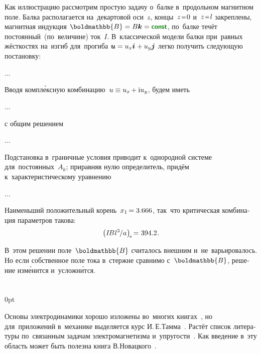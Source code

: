 \begin{otherlanguage}{russian}
Как иллюстрацию рассмотрим простую задачу о~балке в~продольном магнитном поле. Балка располагается на~декартовой оси~$z$, концы~${z \narroweq 0}$ и~${z \narroweq l}$ закреплены, магнитная индукция ${\boldmathbb{B} = B\bm{k} = \boldconst}$, по~балке течёт постоянный~(по~величине) ток~$I$. В~классической модели балки при~равных жёсткостях на~изгиб для~прогиба ${\bm{u} = u_x\bm{i} \hspace{.12ex} + u_y\bm{j}}$ легко получить следующую постановку:

...

Вводя компл\'{е}ксную комбинацию~${u \equiv u_x \hspace{-0.16ex} + \mathrm{i} u_y}$, будем иметь

...

\noindent с общим решением

...

\noindent Подстановка в~граничные условия приводит к~однородной системе для~постоянных~${A_k}$; приравняв нулю определитель, придём к~характеристическому уравнению

...


\noindent Наименьший положительный корень~${x_1 \hspace{-0.2ex} = 3.666}$, так~что критическая комбинация параметров такова:
\[
\left( I \hspace{-0.25ex} B \hspace{.1ex} {l^3} \hspace{-0.2ex} / a \hspace{.1ex} \right)_{\hspace{-0.32ex}*} \hspace{-0.32ex} = \hspace{.1ex} 394.2 \hspace{.12ex}.
\]

В~этом решении поле~$\boldmathbb{B}$ считалось внешним и~не~варьировалось. Но если собственное поле тока в~стержне сравнимо с~$\boldmathbb{B}$, решение изм\'{е}нится и~усложн\'{и}тся.

\end{otherlanguage}

\section*{\small \wordforbibliography}

\begin{changemargin}{\parindent}{0pt}
\fontsize{10}{12}\selectfont

\begin{otherlanguage}{russian}

Основы электродинамики хорошо изложены во~многих книгах~\cite{classicalelectrodynamics, feynman-lecturesonphysics}, но для~приложений в~механике выделяется курс И.\,Е.\;Тамма~\cite{tamm-electricity}. Растёт список литературы по~связанным задачам электромагнетизма и~упругости~\cite{parton-electromagneticelasticity, podstrigach.burak.kondrat-magnetothermoelasticity}. Как введение в~эту область может быть полезна книга В.\;Новацкого~\cite{nowacki-electromagneticeffects}.

\end{otherlanguage}

\end{changemargin}
